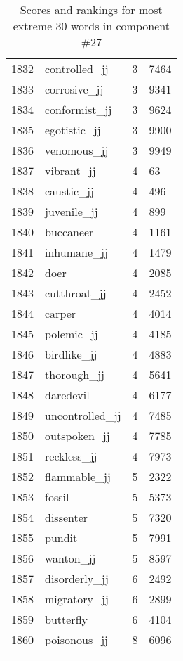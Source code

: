 \begin{longtable}[!htbp]{| rlr@{.}l |}
    1832 & controlled\_jj & 3 & 7464 \\
    1833 & corrosive\_jj & 3 & 9341 \\
    1834 & conformist\_jj & 3 & 9624 \\
    1835 & egotistic\_jj & 3 & 9900 \\
    1836 & venomous\_jj & 3 & 9949 \\
    1837 & vibrant\_jj & 4 & 63 \\
    1838 & caustic\_jj & 4 & 496 \\
    1839 & juvenile\_jj & 4 & 899 \\
    1840 & buccaneer & 4 & 1161 \\
    1841 & inhumane\_jj & 4 & 1479 \\
    1842 & doer & 4 & 2085 \\
    1843 & cutthroat\_jj & 4 & 2452 \\
    1844 & carper & 4 & 4014 \\
    1845 & polemic\_jj & 4 & 4185 \\
    1846 & birdlike\_jj & 4 & 4883 \\
    1847 & thorough\_jj & 4 & 5641 \\
    1848 & daredevil & 4 & 6177 \\
    1849 & uncontrolled\_jj & 4 & 7485 \\
    1850 & outspoken\_jj & 4 & 7785 \\
    1851 & reckless\_jj & 4 & 7973 \\
    1852 & flammable\_jj & 5 & 2322 \\
    1853 & fossil & 5 & 5373 \\
    1854 & dissenter & 5 & 7320 \\
    1855 & pundit & 5 & 7991 \\
    1856 & wanton\_jj & 5 & 8597 \\
    1857 & disorderly\_jj & 6 & 2492 \\
    1858 & migratory\_jj & 6 & 2899 \\
    1859 & butterfly & 6 & 4104 \\
    1860 & poisonous\_jj & 8 & 6096 \\
    \hline
    \caption{Scores and rankings for most extreme 30 words in component \#27} \\
\end{longtable}
